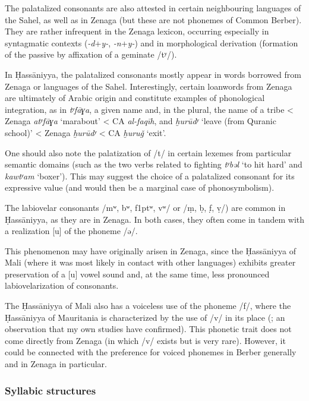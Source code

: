 \documentclass[output=paper]{langsci/langscibook}
\begin{document}
The palatalized consonants are also attested in certain neighbouring languages of the Sahel, as well as in Zenaga (but these are not phonemes of Common Berber). They are rather infrequent in the Zenaga lexicon, occurring especially in syntagmatic contexts (\textit{{}-d}+\textit{y-}, \textit{{}-n}+\textit{y-}) and in morphological derivation (formation of the passive by affixation of a geminate /tʸ/).

In Ḥassāniyya, the palatalized consonants mostly appear in words borrowed from Zenaga or languages of the Sahel. Interestingly, certain loanwords from Zenaga are ultimately of Arabic origin and constitute examples of phonological integration, as in \textit{tʸfāɣa}, a given name and, in the plural, the name of a tribe < Zenaga \textit{atʸfāɣa} ‘marabout’ < CA \textit{al-faqīh}, and \textit{ḫurūdʸ} ‘leave (from Quranic school)’ < Zenaga \textit{ḫurūdʸ} < CA \textit{ḫuruǧ} ‘exit’.

One should also note the palatization of /t/ in certain lexemes from particular semantic domains (such as the two verbs related to fighting \textit{tʸbəl} ‘to hit hard’ and \textit{kawtʸam} ‘boxer’). This may suggest the choice of a palatalized consonant for its expressive value (and would then be a marginal case of phonosymbolism).

The labiovelar consonants /mʷ, bʷ, f\kern 1ptʷ, vʷ/ or /ṃ, ḅ, f̣, ṿ/) are common in Ḥassāniyya, as they are in Zenaga. In both cases, they often come in tandem with a realization [u] of the phoneme /ə/. 

This phenomenon may have originally arisen in Zenaga, since the Ḥassāniyya of Mali (where it was most likely in contact with other languages) exhibits greater preservation of a [u] vowel sound and, at the same time, less pronounced labiovelarization of consonants. 

The Ḥassāniyya of Mali also has a voiceless use of the phoneme /f/, where the Ḥassāniyya of Mauritania is characterized by the use of /v/ in its place (\citealt{Heath2004}; an observation that my own studies have confirmed). This phonetic trait does not come directly from Zenaga (in which /v/ exists but is very rare). However, it could be connected with the preference for voiced phonemes in Berber generally and in Zenaga in particular.

\subsubsection{Syllabic structures} %
\end{document}
